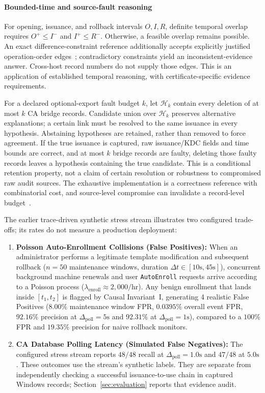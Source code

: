 \paragraph{Bounded-time and source-fault reasoning}
For opening, issuance, and rollback intervals $O,I,R$, definite temporal overlap requires $O^{+}\le I^{-}$ and $I^{+}\le R^{-}$. Otherwise, a feasible overlap remains possible. An exact difference-constraint reference additionally accepts explicitly justified operation-order edges~\cite{dechter1991temporal,amarilli2017order}; contradictory constraints yield an inconsistent-evidence answer. Cross-host record numbers do not supply those edges. This is an application of established temporal reasoning, with certificate-specific evidence requirements.

For a declared optional-export fault budget $k$, let $\mathcal{H}_k$ contain every deletion of at most $k$ CA bridge records. Candidate union over $\mathcal{H}_k$ preserves alternative explanations; a certain link must be resolved to the same issuance in every hypothesis. Abstaining hypotheses are retained, rather than removed to force agreement. If the true issuance is captured, raw issuance/KDC fields and time bounds are correct, and at most $k$ bridge records are faulty, deleting those faulty records leaves a hypothesis containing the true candidate. This is a conditional retention property, not a claim of certain resolution or robustness to compromised raw audit sources. The exhaustive implementation is a correctness reference with combinatorial cost, and source-level compromise can invalidate a record-level budget~\cite{elmagarmid2007duplicate,heinzl2026timestamps}.

The earlier trace-driven synthetic stress stream illustrates two configured trade-offs; its rates do not measure a production deployment:
\begin{enumerate}
    \item \textbf{Poisson Auto-Enrollment Collisions (False Positives):} When an administrator performs a legitimate template modification and subsequent rollback ($n=50$ maintenance windows, duration $\Delta t \in [10\text{s}, 45\text{s}]$), concurrent background machine renewals and user \texttt{AutoEnroll} requests arrive according to a Poisson process ($\lambda_{\text{enroll}} \approx 2,000/\text{hr}$). Any benign enrollment that lands inside $[t_1, t_2]$ is flagged by Causal Invariant~I, generating 4 realistic False Positives ($8.00\%$ maintenance window FPR, $0.0395\%$ overall event FPR, $92.16\%$ precision at $\Delta_{\text{poll}}=5\text{s}$ and $92.31\%$ at $\Delta_{\text{poll}}=1\text{s}$), compared to a $100\%$ FPR and $19.35\%$ precision for naive rollback monitors.
    \item \textbf{CA Database Polling Latency (Simulated False Negatives):} The configured stress stream reports $48/48$ recall at $\Delta_{\text{poll}}=1.0\text{s}$ and $47/48$ at $5.0\text{s}$. These outcomes use the stream's synthetic labels. They are separate from independently checking a successful issuance-to-use chain in captured Windows records; Section~\ref{sec:evaluation} reports that evidence audit.
\end{enumerate}

